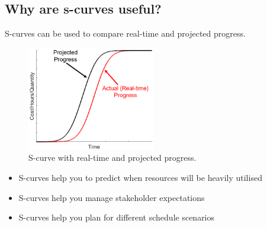 \subsection{Why are s-curves useful?}
S-curves can be used to compare real-time and projected progress.
\begin{figure}[H]
    \centering
    \includegraphics[width = 0.5\textwidth]{img/figure60.png}
    \caption{S-curve with real-time and projected progress.}
\end{figure}
\begin{itemize}
    \item S-curves help you to predict when resources will be heavily utilised
    \item S-curves help you manage stakeholder expectations
    \item S-curves help you plan for different schedule scenarios
\end{itemize}

